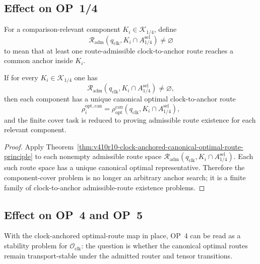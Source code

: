 \subsection{Effect on OP~1/4}
\label{subsec:v410r10-effect-on-op14}

\begin{definition}
\label{def:v410r10-clock-to-anchor-admissibility-op14}
For a comparison-relevant component \(K_i\in\mathcal K_{1/4}\), define
\[
 \mathcal R_{\mathrm{adm}}
 (q_{\mathrm{clk}},K_i\cap A_{1/4}^{\mathrm{sel}})
 \neq\varnothing
\]
to mean that at least one route-admissible clock-to-anchor route reaches a
common anchor inside \(K_i\).
\end{definition}

\begin{proposition}
\label{prop:v410r10-op14-cover-becomes-route-existence}
If for every \(K_i\in\mathcal K_{1/4}\) one has
\[
 \mathcal R_{\mathrm{adm}}
 (q_{\mathrm{clk}},K_i\cap A_{1/4}^{\mathrm{sel}})
 \neq\varnothing,
\]
then each component has a unique canonical optimal clock-to-anchor route
\[
 \rho_i^{\mathrm{opt,can}}
 =
 \rho_{\mathrm{opt}}^{\mathrm{can}}
 (q_{\mathrm{clk}},K_i\cap A_{1/4}^{\mathrm{sel}}),
\]
and the finite cover task is reduced to proving admissible route existence for
each relevant component.
\end{proposition}

\begin{proof}
Apply Theorem~\ref{thm:v410r10-clock-anchored-canonical-optimal-route-principle}
to each nonempty admissible route space
\(\mathcal R_{\mathrm{adm}}(q_{\mathrm{clk}},K_i\cap A_{1/4}^{\mathrm{sel}})\).
Each such route space has a unique canonical optimal representative. Therefore
the component-cover problem is no longer an arbitrary anchor search; it is a
finite family of clock-to-anchor admissible-route existence problems.
\end{proof}

\subsection{Effect on OP~4 and OP~5}
\label{subsec:v410r10-effect-on-op4-op5}

\begin{remark}
\label{rem:v410r10-op4-as-optimal-route-map-stability}
With the clock-anchored optimal-route map in place, OP~4 can be read as a
stability problem for \(\mathcal O_{\mathrm{clk}}\): the question is whether the
canonical optimal routes remain transport-stable under the admitted router and
tensor transitions.
\end{remark}

